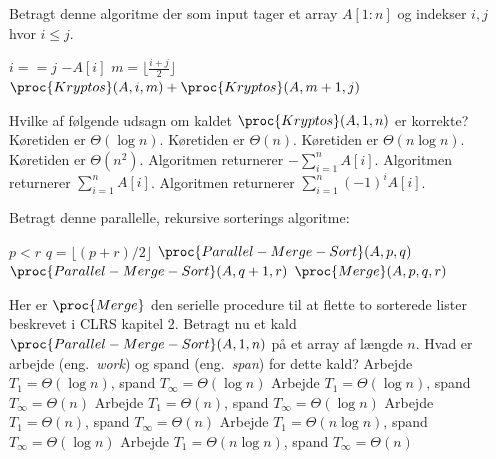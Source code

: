 Betragt denne algoritme der som input tager et array $A[1:n]$ og indekser $i,j$ hvor $i\leq j$.
\begin{codebox}
\li \If $i==j$ \Do
\li     \Return $-A[i]$
\End
\li $m=\lfloor\frac{i+j}2\rfloor$
\li \Return $\proc{Kryptos}(A, i, m)+\proc{Kryptos}(A, m+1,j)$
\end{codebox}
Hvilke af følgende udsagn om kaldet $\proc{Kryptos}(A, 1, n)$ er korrekte?
\fleresvar
\mulighederstart
\svar Køretiden er $\Theta(\log n)$.
\svar Køretiden er $\Theta(n)$.\korrekt
\svar Køretiden er $\Theta(n \log n)$.
\svar Køretiden er $\Theta(n^2)$.
\svar Algoritmen returnerer $-\sum_{i=1}^n A[i]$.\korrekt
\svar Algoritmen returnerer $\sum_{i=1}^n A[i]$.
\svar Algoritmen returnerer $\sum_{i=1}^n (-1)^i A[i]$.
\mulighederslut
{}


Betragt denne parallelle, rekursive sorterings algoritme:
%
\begin{codebox}
  \li \If $p<r$ \Do
  \li $q = \lfloor (p+r)/2\rfloor$
  \li \Spawn $\proc{Parallel-Merge-Sort}(A, p, q)$
  \li \Spawn $\proc{Parallel-Merge-Sort}(A, q+1, r)$
  \li     \Sync
  \li $\proc{Merge}(A, p, q, r)$ \End
\end{codebox}
Her er $\proc{Merge}$ den serielle procedure til at flette to sorterede lister beskrevet i CLRS kapitel 2. 
Betragt nu et kald $\proc{Parallel-Merge-Sort}(A, 1, n)$ på et array af længde $n$.
Hvad er arbejde (eng.~\emph{work}) og spand (eng.~\emph{span}) for dette kald?
\etsvar
\mulighederstart
\svar Arbejde $T_1=\Theta(\log n)$, spand $T_\infty=\Theta(\log n)$
\svar Arbejde $T_1=\Theta(\log n)$, spand $T_\infty=\Theta(n)$
\svar Arbejde $T_1=\Theta(n)$, spand $T_\infty=\Theta(\log n)$
\svar Arbejde $T_1=\Theta(n)$, spand $T_\infty=\Theta(n)$
\svar Arbejde $T_1=\Theta(n \log n)$, spand $T_\infty=\Theta(\log n)$
\svar Arbejde $T_1=\Theta(n \log n)$, spand $T_\infty=\Theta(n)$\korrekt
\mulighederslut



